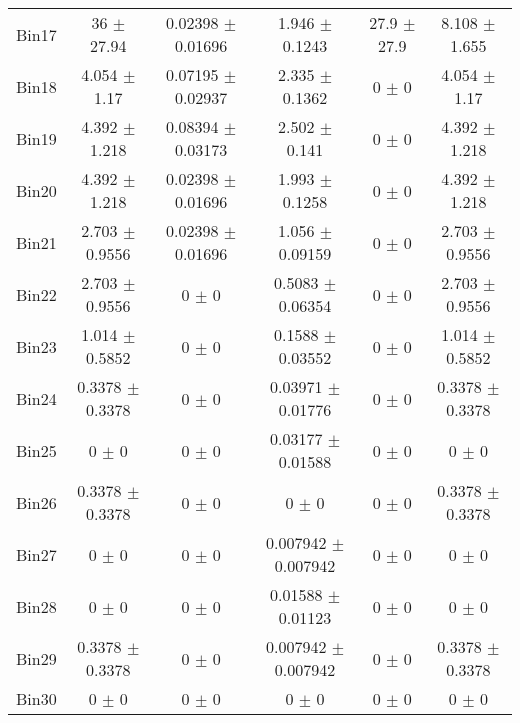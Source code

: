 \begin{tabular}{@{\extracolsep{4pt}}lccccc@{}}
     Bin17 & 36 $\pm$ 27.94 & 0.02398 $\pm$ 0.01696 & 1.946 $\pm$ 0.1243 & 27.9 $\pm$ 27.9 & 8.108 $\pm$ 1.655 \\ 
     Bin18 & 4.054 $\pm$ 1.17 & 0.07195 $\pm$ 0.02937 & 2.335 $\pm$ 0.1362 & 0 $\pm$ 0 & 4.054 $\pm$ 1.17 \\ 
     Bin19 & 4.392 $\pm$ 1.218 & 0.08394 $\pm$ 0.03173 & 2.502 $\pm$ 0.141 & 0 $\pm$ 0 & 4.392 $\pm$ 1.218 \\ 
     Bin20 & 4.392 $\pm$ 1.218 & 0.02398 $\pm$ 0.01696 & 1.993 $\pm$ 0.1258 & 0 $\pm$ 0 & 4.392 $\pm$ 1.218 \\ 
     Bin21 & 2.703 $\pm$ 0.9556 & 0.02398 $\pm$ 0.01696 & 1.056 $\pm$ 0.09159 & 0 $\pm$ 0 & 2.703 $\pm$ 0.9556 \\ 
     Bin22 & 2.703 $\pm$ 0.9556 & 0 $\pm$ 0 & 0.5083 $\pm$ 0.06354 & 0 $\pm$ 0 & 2.703 $\pm$ 0.9556 \\ 
     Bin23 & 1.014 $\pm$ 0.5852 & 0 $\pm$ 0 & 0.1588 $\pm$ 0.03552 & 0 $\pm$ 0 & 1.014 $\pm$ 0.5852 \\ 
     Bin24 & 0.3378 $\pm$ 0.3378 & 0 $\pm$ 0 & 0.03971 $\pm$ 0.01776 & 0 $\pm$ 0 & 0.3378 $\pm$ 0.3378 \\ 
     Bin25 & 0 $\pm$ 0 & 0 $\pm$ 0 & 0.03177 $\pm$ 0.01588 & 0 $\pm$ 0 & 0 $\pm$ 0 \\ 
     Bin26 & 0.3378 $\pm$ 0.3378 & 0 $\pm$ 0 & 0 $\pm$ 0 & 0 $\pm$ 0 & 0.3378 $\pm$ 0.3378 \\ 
     Bin27 & 0 $\pm$ 0 & 0 $\pm$ 0 & 0.007942 $\pm$ 0.007942 & 0 $\pm$ 0 & 0 $\pm$ 0 \\ 
     Bin28 & 0 $\pm$ 0 & 0 $\pm$ 0 & 0.01588 $\pm$ 0.01123 & 0 $\pm$ 0 & 0 $\pm$ 0 \\ 
     Bin29 & 0.3378 $\pm$ 0.3378 & 0 $\pm$ 0 & 0.007942 $\pm$ 0.007942 & 0 $\pm$ 0 & 0.3378 $\pm$ 0.3378 \\ 
     Bin30 & 0 $\pm$ 0 & 0 $\pm$ 0 & 0 $\pm$ 0 & 0 $\pm$ 0 & 0 $\pm$ 0 \\ 
\hline\hline
  \end{tabular}
